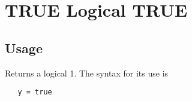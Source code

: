 \section{TRUE Logical TRUE}

\subsection{Usage}

Returns a logical 1.  The syntax for its use is
\begin{verbatim}
   y = true
\end{verbatim}
